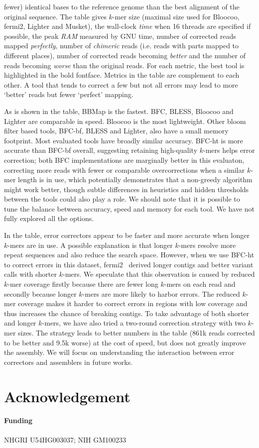 \documentclass{bioinfo}
\begin{document}
\begin{table}[t]
{fewer) identical bases to the reference genome than the best alignment of the
original sequence. The table gives $k$-mer size (maximal size used for Bloocoo,
fermi2, Lighter and Musket), the wall-clock \emph{time} when 16 threads are
specified if possible, the peak \emph{RAM} measured by GNU time, number of
corrected reads mapped \emph{perfectly}, number of \emph{chimeric} reads (i.e. reads with parts mapped to different places),
number of corrected reads becoming \emph{better} and the number of reads
becoming \emph{worse} than the original reads. For each metric, the best tool
is highlighted in the bold fontface. Metrics in the table are complement to
each other. A tool that tends to correct a few but not all errors may lead to more
`better' reads but fewer `perfect' mapping.}  \end{table}

As is shown in the table, BBMap is the fastest. BFC, BLESS, Bloocoo and Lighter
are comparable in speed. Bloocoo is the most lightweight. Other bloom filter
based tools, BFC-bf, BLESS and Lighter, also have a small memory footprint.
Most evaluated tools have broadly similar accuracy.  BFC-ht is more accurate
than BFC-bf overall, suggesting retaining high-quality $k$-mers helps error
correction; both BFC implementations are marginally better in this evaluaton,
correcting more reads with fewer or comparable overcorrections when a similar
$k$-mer length is in use, which potentially demonstrates that a non-greedy
algorithm might work better, though subtle differences in heuristics and hidden
thresholds between the tools could also play a role.  We should note that it is
possible to tune the balance between accuracy, speed and memory for each tool.
We have not fully explored all the options.

In the table, error correctors appear to be faster and more accurate when
longer $k$-mers are in use. A possible explanation is that longer $k$-mers
resolve more repeat sequences and also reduce the search space. However, when
we use BFC-ht to correct errors in this dataset, fermi2~\citep{Li:2012fk}
derived longer contigs and better variant calls with shorter $k$-mers. We
speculate that this observation is caused by reduced $k$-mer coverage firstly
because there are fewer long $k$-mers on each read and secondly because longer
$k$-mers are more likely to harbor errors. The reduced $k$-mer coverage makes
it harder to correct errors in regions with low coverage and thus increases the
chance of breaking contigs.  To take advantage of both shorter and longer
$k$-mers, we have also tried a two-round correction strategy with two $k$-mer
sizes. The strategy leads to better numbers in the table (861k reads corrected
to be better and 9.5k worse) at the cost of speed, but does not greatly improve
the assembly. We will focus on understanding the interaction between error
correctors and assemblers in future works.


\section*{Acknowledgement}
\paragraph{Funding\textcolon} NHGRI U54HG003037; NIH GM100233


\end{document}
